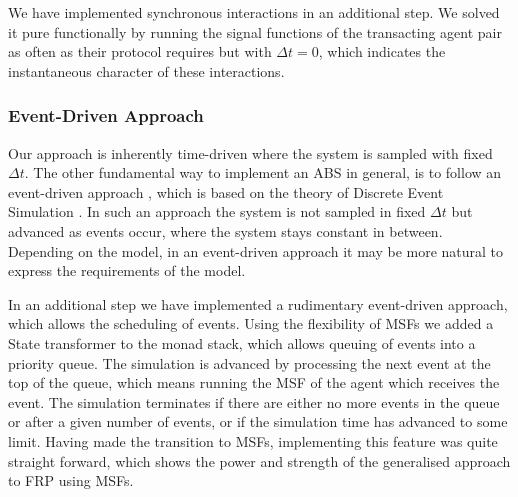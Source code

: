 We have implemented synchronous interactions in an additional step. We solved it pure functionally by running the signal functions of the transacting agent pair as often as their protocol requires but with $\Delta t=0$, which indicates the instantaneous character of these interactions.

\subsubsection{Event-Driven Approach}
Our approach is inherently time-driven where the system is sampled with fixed $\Delta t$. The other fundamental way to implement an ABS in general, is to follow an event-driven approach \cite{meyer_event-driven_2014}, which is based on the theory of Discrete Event Simulation \cite{zeigler_theory_2000}. In such an approach the system is not sampled in fixed $\Delta t$ but advanced as events occur, where the system stays constant in between. Depending on the model, in an event-driven approach it may be more natural to express the requirements of the model.

In an additional step we have implemented a rudimentary event-driven approach, which allows the scheduling of events. Using the flexibility of MSFs we added a State transformer to the monad stack, which allows queuing of events into a priority queue. The simulation is advanced by processing the next event at the top of the queue, which means running the MSF of the agent which receives the event. The simulation terminates if there are either no more events in the queue or after a given number of events, or if the simulation time has advanced to some limit. Having made the transition to MSFs, implementing this feature was quite straight forward, which shows the power and strength of the generalised approach to FRP using MSFs.


